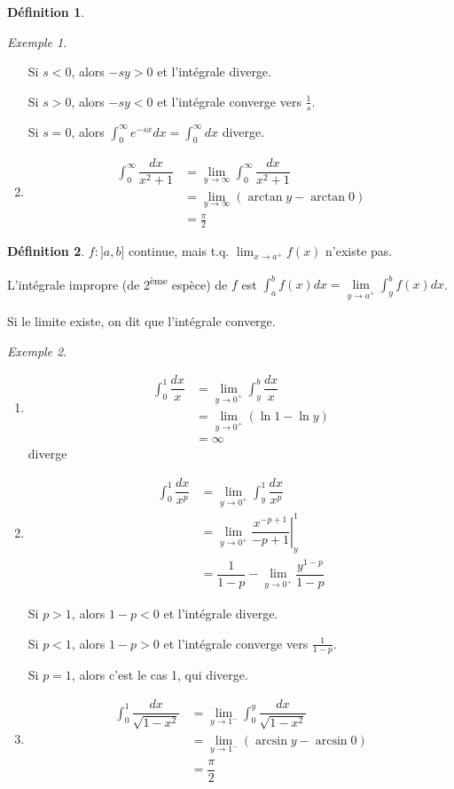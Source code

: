 \documentclass{report}
\theoremstyle{definition}
\newtheorem*{defin}{D\'efinition}
\theoremstyle{remark}
\newtheorem*{exem}{Exemple}
\begin{document}
\begin{defin}
\begin{exem}
\begin{enumerate}
				Si $s<0$, alors $-sy>0$ et l'int\'egrale diverge.

				Si $s>0$, alors $-sy<0$ et l'int\'egrale converge vers $\frac{1}{s}$.

				Si $s=0$, alors $\displaystyle\int_{0}^{\infty}e^{-sx}dx = \displaystyle\int_{0}^{\infty}dx$ diverge.
				\item \begin{align*}
					\int_{0}^{\infty}\dfrac{dx}{x^2+1}&= \lim_{y \to \infty}\int_{0}^{\infty}\dfrac{dx}{x^2+1}\\
					&= \lim_{y \to \infty}(\arctan y - \arctan0)\\
					&= \frac{\pi}{2}
				\end{align*}
			\end{enumerate}
		\end{exem}
	\end{defin}
	\begin{defin}
		$f:]a,b]$ continue, mais t.q. $\lim_{x \to a^+}f(x)$ n'existe pas.

		L'int\'egrale impropre (de 2\textsuperscript{\`eme} esp\`ece) de $f$ est $\displaystyle\int_{a}^{b}f(x)dx = \lim\limits_{y \to a^+}\displaystyle\int_{y}^{b}f(x)dx$.

		Si le limite existe, on dit que l'int\'egrale converge.
		\begin{exem}~

			\begin{enumerate}
				\item \begin{align*}
					\int_{0}^{1}\dfrac{dx}{x}&= \lim_{y \to 0^+}\int_{y}^{b}\dfrac{dx}{x}\\
					&= \lim_{y \to 0^+}(\ln1-\ln y)\\
					&= \infty
				\end{align*}
				diverge
				\item \begin{align*}
					\int_{0}^{1}\dfrac{dx}{x^p}&= \lim_{y \to 0^+}\int_{y}^{1}\dfrac{dx}{x^p}\\
					&= \lim_{y \to 0^+}\left. \dfrac{x^{-p+1}}{-p+1} \right|^1_y\\
					&= \dfrac{1}{1-p} - \lim_{y \to 0^+}\dfrac{y^{1-p}}{1-p}
				\end{align*}

				Si $p>1$, alors $1-p<0$ et l'int\'egrale diverge.

				Si $p<1$, alors $1-p>0$ et l'int\'egrale converge vers $\frac{1}{1-p}$.

				Si $p=1$, alors c'est le cas 1, qui diverge.
				\item \begin{align*}
					\int_{0}^{1}\dfrac{dx}{\sqrt{1-x^2}}&= \lim_{y \to 1^-}\int_{0}^{y}\dfrac{dx}{\sqrt{1-x^2}}\\
					&= \lim_{y \to 1^-}(\arcsin y - \arcsin0)\\
					&= \dfrac{\pi}{2}
				\end{align*}
			\end{enumerate}
		\end{exem}
	\end{defin}
\end{document}
